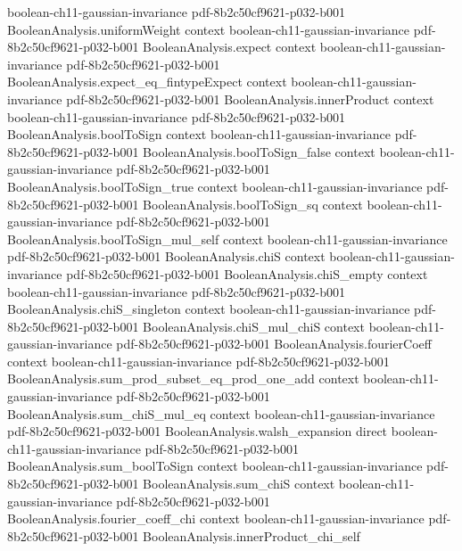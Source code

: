 \begin{theorem}
  {boolean-ch11-gaussian-invariance}
  {pdf-8b2c50cf9621-p032-b001}
\proofstep
  {BooleanAnalysis.uniformWeight}
  {context}
  {boolean-ch11-gaussian-invariance}
  {pdf-8b2c50cf9621-p032-b001}
\proofstep
  {BooleanAnalysis.expect}
  {context}
  {boolean-ch11-gaussian-invariance}
  {pdf-8b2c50cf9621-p032-b001}
\proofstep
  {BooleanAnalysis.expect_eq_fintypeExpect}
  {context}
  {boolean-ch11-gaussian-invariance}
  {pdf-8b2c50cf9621-p032-b001}
\proofstep
  {BooleanAnalysis.innerProduct}
  {context}
  {boolean-ch11-gaussian-invariance}
  {pdf-8b2c50cf9621-p032-b001}
\proofstep
  {BooleanAnalysis.boolToSign}
  {context}
  {boolean-ch11-gaussian-invariance}
  {pdf-8b2c50cf9621-p032-b001}
\proofstep
  {BooleanAnalysis.boolToSign_false}
  {context}
  {boolean-ch11-gaussian-invariance}
  {pdf-8b2c50cf9621-p032-b001}
\proofstep
  {BooleanAnalysis.boolToSign_true}
  {context}
  {boolean-ch11-gaussian-invariance}
  {pdf-8b2c50cf9621-p032-b001}
\proofstep
  {BooleanAnalysis.boolToSign_sq}
  {context}
  {boolean-ch11-gaussian-invariance}
  {pdf-8b2c50cf9621-p032-b001}
\proofstep
  {BooleanAnalysis.boolToSign_mul_self}
  {context}
  {boolean-ch11-gaussian-invariance}
  {pdf-8b2c50cf9621-p032-b001}
\proofstep
  {BooleanAnalysis.chiS}
  {context}
  {boolean-ch11-gaussian-invariance}
  {pdf-8b2c50cf9621-p032-b001}
\proofstep
  {BooleanAnalysis.chiS_empty}
  {context}
  {boolean-ch11-gaussian-invariance}
  {pdf-8b2c50cf9621-p032-b001}
\proofstep
  {BooleanAnalysis.chiS_singleton}
  {context}
  {boolean-ch11-gaussian-invariance}
  {pdf-8b2c50cf9621-p032-b001}
\proofstep
  {BooleanAnalysis.chiS_mul_chiS}
  {context}
  {boolean-ch11-gaussian-invariance}
  {pdf-8b2c50cf9621-p032-b001}
\proofstep
  {BooleanAnalysis.fourierCoeff}
  {context}
  {boolean-ch11-gaussian-invariance}
  {pdf-8b2c50cf9621-p032-b001}
\proofstep
  {BooleanAnalysis.sum_prod_subset_eq_prod_one_add}
  {context}
  {boolean-ch11-gaussian-invariance}
  {pdf-8b2c50cf9621-p032-b001}
\proofstep
  {BooleanAnalysis.sum_chiS_mul_eq}
  {context}
  {boolean-ch11-gaussian-invariance}
  {pdf-8b2c50cf9621-p032-b001}
\proofstep
  {BooleanAnalysis.walsh_expansion}
  {direct}
  {boolean-ch11-gaussian-invariance}
  {pdf-8b2c50cf9621-p032-b001}
\proofstep
  {BooleanAnalysis.sum_boolToSign}
  {context}
  {boolean-ch11-gaussian-invariance}
  {pdf-8b2c50cf9621-p032-b001}
\proofstep
  {BooleanAnalysis.sum_chiS}
  {context}
  {boolean-ch11-gaussian-invariance}
  {pdf-8b2c50cf9621-p032-b001}
\proofstep
  {BooleanAnalysis.fourier_coeff_chi}
  {context}
  {boolean-ch11-gaussian-invariance}
  {pdf-8b2c50cf9621-p032-b001}
\proofstep
  {BooleanAnalysis.innerProduct_chi_self}

\end{theorem}

